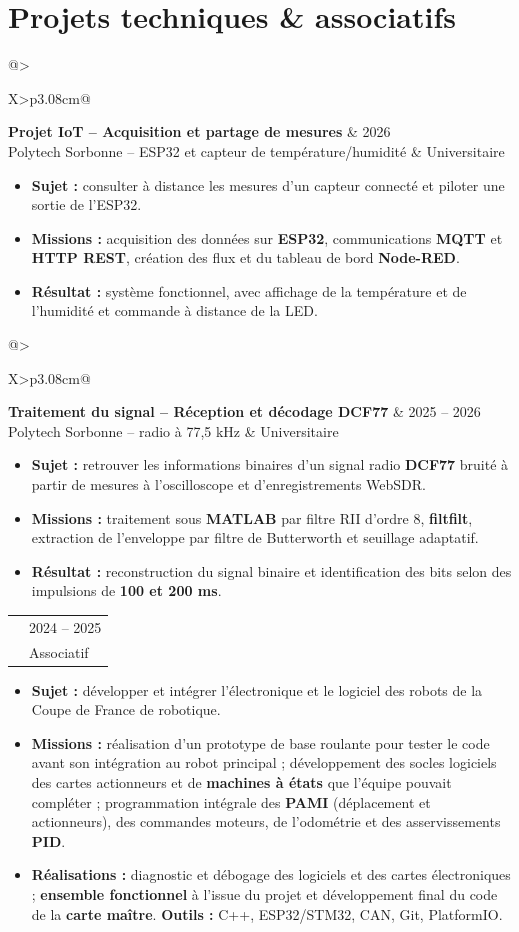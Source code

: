 \documentclass[9pt,a4paper]{extarticle}
\makeatletter
\newcommand{\entry}[4]{%
\begin{tabularx}{\linewidth}{@{}>{\raggedright\arraybackslash}X>{\raggedleft\arraybackslash}p{3.08cm}@{}}
 {\bfseries\color{bleu}#1} & {\fontsize{8.5}{9.3}\selectfont\color{secondaire}#2} \\[-2pt]
 {\fontsize{8.5}{9.6}\selectfont\color{secondaire}#3} & {\fontsize{8.5}{9.3}\selectfont\color{secondaire}#4}
\end{tabularx}\vspace{-2.6pt}\par}
\newcommand{\gapentry}{\vspace{2.4pt}}
\makeatother
\begin{document}
\section{Projets techniques \& associatifs}
\entry{Projet IoT -- Acquisition et partage de mesures}{2026}{Polytech Sorbonne -- ESP32 et capteur de température/humidité}{Universitaire}
\begin{itemize}
  \item \textbf{Sujet :} consulter à distance les mesures d'un capteur connecté et piloter une sortie de l'ESP32.
  \item \textbf{Missions :} acquisition des données sur \textbf{ESP32}, communications \textbf{MQTT} et \textbf{HTTP REST}, création des flux et du tableau de bord \textbf{Node-RED}.
  \item \textbf{Résultat :} système fonctionnel, avec affichage de la température et de l'humidité et commande à distance de la LED.
\end{itemize}
\gapentry
\entry{Traitement du signal -- Réception et décodage DCF77}{2025 -- 2026}{Polytech Sorbonne -- radio à 77,5 kHz}{Universitaire}
\begin{itemize}
  \item \textbf{Sujet :} retrouver les informations binaires d'un signal radio \textbf{DCF77} bruité à partir de mesures à l'oscilloscope et d'enregistrements WebSDR.
  \item \textbf{Missions :} traitement sous \textbf{MATLAB} par filtre RII d'ordre 8, \textbf{filtfilt}, extraction de l'enveloppe par filtre de Butterworth et seuillage adaptatif.
  \item \textbf{Résultat :} reconstruction du signal binaire et identification des bits selon des impulsions de \textbf{100 et 200 ms}.
\end{itemize}
\gapentry
\entry{Coupe de France de robotique -- Responsable électronique / asservissement}{2024 -- 2025}{Club CRAC -- robot autonome développé en équipe}{Associatif}
\begin{itemize}
  \item \textbf{Sujet :} développer et intégrer l'électronique et le logiciel des robots de la Coupe de France de robotique.
  \item \textbf{Missions :} réalisation d'un prototype de base roulante pour tester le code avant son intégration au robot principal ; développement des socles logiciels des cartes actionneurs et de \textbf{machines à états} que l'équipe pouvait compléter ; programmation intégrale des \textbf{PAMI} (déplacement et actionneurs), des commandes moteurs, de l'odométrie et des asservissements \textbf{PID}.
  \item \textbf{Réalisations :} diagnostic et débogage des logiciels et des cartes électroniques ; \textbf{ensemble fonctionnel} à l'issue du projet et développement final du code de la \textbf{carte maître}. \textbf{Outils :} C++, ESP32/STM32, CAN, Git, PlatformIO.
\end{itemize}
\end{document}
